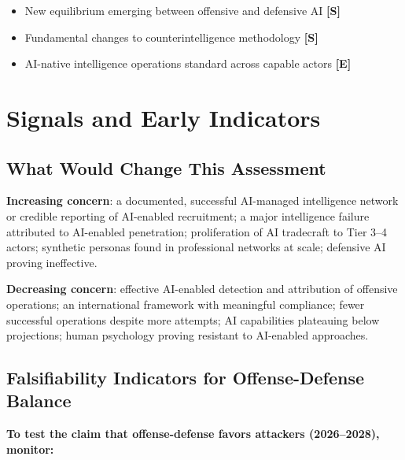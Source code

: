 \documentclass[11pt,letterpaper]{article}
\begin{document}
\begin{itemize}
  \item New equilibrium emerging between offensive and defensive AI \textbf{[S]}
  \item Fundamental changes to counterintelligence methodology \textbf{[S]}
  \item AI-native intelligence operations standard across capable actors \textbf{[E]}
\end{itemize}

\section{Signals and Early Indicators}\label{sec:signals}

\subsection{What Would Change This Assessment}

\textbf{Increasing concern}: a documented, successful AI-managed intelligence network or credible reporting of AI-enabled recruitment; a major intelligence failure attributed to AI-enabled penetration; proliferation of AI tradecraft to Tier 3--4 actors; synthetic personas found in professional networks at scale; defensive AI proving ineffective.

\textbf{Decreasing concern}: effective AI-enabled detection and attribution of offensive operations; an international framework with meaningful compliance; fewer successful operations despite more attempts; AI capabilities plateauing below projections; human psychology proving resistant to AI-enabled approaches.

\subsection{Falsifiability Indicators for Offense-Defense Balance}

\textbf{To test the claim that offense-defense favors attackers (2026--2028), monitor:}
\end{document}
